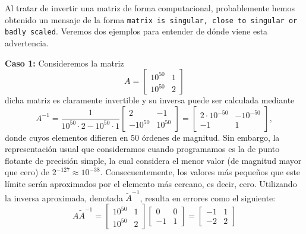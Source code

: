 \begin{mdframed}[style=discusion, frametitle={\center ¿Matriz cuasi-singular o incorrectamente escalada?}]

Al tratar de invertir una matriz de forma computacional, probablemente hemos obtenido un mensaje de la forma \texttt{matrix is singular, close to singular or badly scaled}. Veremos dos ejemplos para entender de dónde viene esta advertencia. 

\noindent\textbf{Caso 1:} Consideremos la matriz 
\begin{equation}
	A = \left[ \begin{matrix}10^{50} & 1 \\  10^{50}  & 2\end{matrix}\right]
\end{equation}
dicha matriz es claramente invertible y su inversa puede ser calculada mediante
\begin{equation}
	A^{-1} = \frac{1}{10^{50} \cdot 2 - 10^{50}\cdot 1}\left[ \begin{matrix}2 & -1 \\  -10^{50}  & 10^{50}\end{matrix}\right]
	=\left[ \begin{matrix}2\cdot10^{-50} & -10^{-50} \\  -1  & 1\end{matrix}\right],
\end{equation}
donde cuyos elementos difieren en 50 órdenes de magnitud. Sin embargo, la representación usual que consideramos cuando programamos es la de punto flotante de precisión simple, la cual considera el menor valor (de magnitud mayor que cero) de $2^{-127}\approx 10^{-38}$. Consecuentemente, los valores más pequeños que este límite serán aproximados por el elemento más cercano, es decir, cero. Utilizando la inversa aproximada, denotada $\tilde{A}^{-1}$, resulta en errores como el siguiente:
\begin{equation}
	A\tilde{A}^{-1} = \left[ \begin{matrix}10^{50} & 1 \\  10^{50}  & 2\end{matrix}\right] \left[ \begin{matrix} 0 & 0 \\  -1  & 1\end{matrix}\right] = \left[ \begin{matrix} -1 & 1 \\  -2  & 2\end{matrix}\right]
\end{equation}


\end{mdframed}
